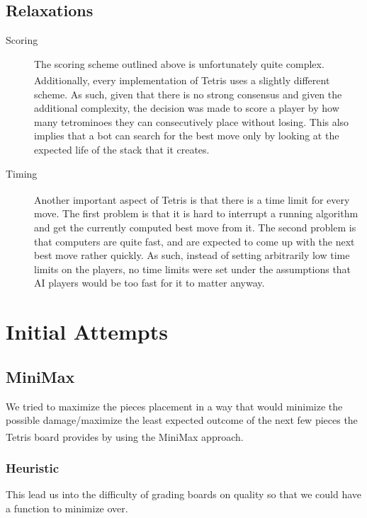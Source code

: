 \documentclass[fontsize=12pt]{article}
\def\tetris{Tetris\textsuperscript{\textregistered}}
\begin{document}
\subsection{Relaxations}
\label{sub:relaxations}
\begin{description}
  \item[Scoring] The scoring scheme outlined above is unfortunately quite complex. Additionally, every implementation of \tetris{} uses a slightly different scheme. As such, given that there is no strong consensus and given the additional complexity, the decision was made to score a player by how many tetrominoes they can consecutively place without losing. This also implies that a bot can search for the best move only by looking at the expected life of the stack that it creates.
  \item[Timing] Another important aspect of \tetris{} is that there is a time limit for every move. The first problem is that it is hard to interrupt a running algorithm and get the currently computed best move from it. The second problem is that computers are quite fast, and are expected to come up with the next best move rather quickly. As such, instead of setting arbitrarily low time limits on the players, no time limits were set under the assumptions that AI players would be too fast for it to matter anyway.
\end{description}



\section{Initial Attempts}
\label{sec:initial_attempts}

\subsection{MiniMax}
\par We tried to maximize the pieces placement in a way that would minimize the possible damage/maximize the least expected outcome of the next few pieces the \tetris{} board provides by using the MiniMax approach.
\subsubsection{Heuristic}
\par This lead us into the difficulty of grading boards on quality so that we could have a function to minimize over.
\end{document}
